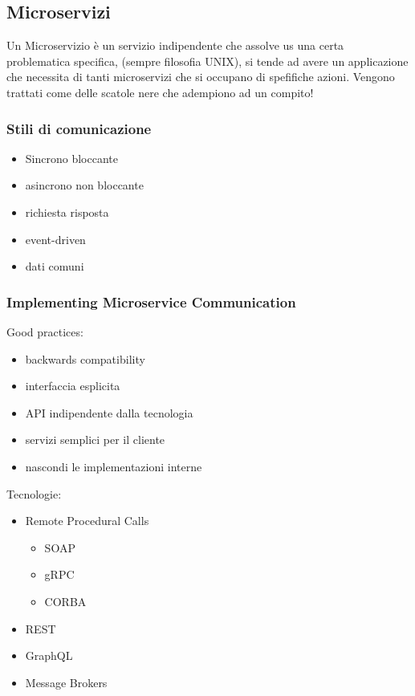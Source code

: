 \subsection{Microservizi}
Un Microservizio è un servizio indipendente che assolve us una certa problematica specifica, (sempre filosofia UNIX), si tende ad avere un applicazione che necessita di tanti microservizi che si occupano di spefifiche azioni.
Vengono trattati come delle scatole nere che adempiono ad un compito!

\subsubsection{Stili di comunicazione}
\begin{itemize}
    \item Sincrono bloccante
    \item asincrono non bloccante
    \item richiesta risposta
    \item event-driven
    \item dati comuni
\end{itemize}

\subsubsection{Implementing Microservice Communication}
Good practices:
\begin{itemize}
    \item backwards compatibility
    \item interfaccia esplicita
    \item API indipendente dalla tecnologia
    \item servizi semplici per il cliente
    \item nascondi le implementazioni interne
\end{itemize}

Tecnologie:
\begin{itemize}
    \item Remote Procedural Calls
        \begin{itemize}
            \item SOAP
            \item gRPC
            \item CORBA
        \end{itemize}
    \item REST
    \item GraphQL
    \item Message Brokers
\end{itemize}